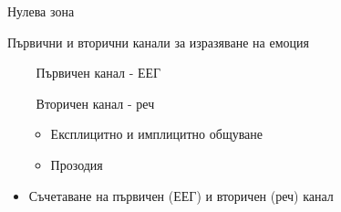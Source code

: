 \documentclass[9pt]{beamer}
\begin{document}
\begin{frame}{Нулева зона}
    \pause
    \begin{center}
        Първични и вторични канали за изразяване на емоция
    \end{center}
    \pause 
    \begin{itemize}
        \item[$\ $] Първичен канал - ЕЕГ
        \pause
        \item[$\ $] Вторичен канал - реч
        \begin{itemize}
            \pause 
            \item Експлицитно и имплицитно общуване
            \pause
            \item Прозодия
        \end{itemize}
        \pause
        \item Съчетаване на първичен (ЕЕГ) и вторичен (реч) канал
    \end{itemize}
\end{frame}
\end{document}
